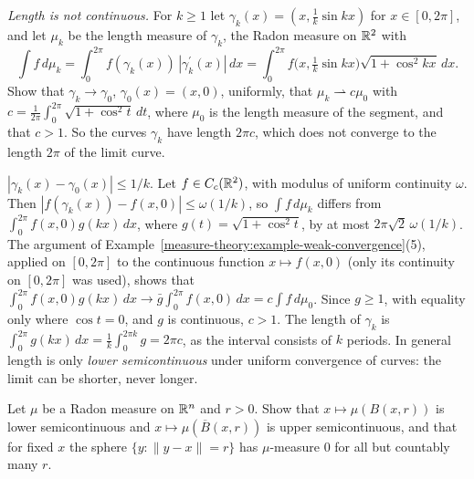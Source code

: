 \begin{exercise}\label{measure-theory:exercise-staircase}
\emph{Length is not continuous.} For $k \geq 1$ let $\gamma_k(x) = (x, \frac1k\sin kx)$ for $x \in [0, 2\pi]$, and let $\mu_k$ be the length measure of $\gamma_k$, the Radon measure on $\mathbb{R}^2$ with
\[
\int f\,d\mu_k = \int_0^{2\pi}f(\gamma_k(x))\,|\gamma_k^{\prime}(x)|\,dx = \int_0^{2\pi}f\bigl(x, \tfrac1k\sin kx\bigr)\sqrt{1 + \cos^2kx}\,dx .
\]
Show that $\gamma_k \to \gamma_0$, $\gamma_0(x) = (x, 0)$, uniformly, that $\mu_k \rightharpoonup c\mu_0$ with $c = \frac1{2\pi}\int_0^{2\pi}\sqrt{1 + \cos^2t}\,dt$, where $\mu_0$ is the length measure of the
segment, and that $c > 1$. So the curves $\gamma_k$ have length $2\pi c$, which does not converge to the length $2\pi$ of the limit curve.
\end{exercise}

\begin{solution}
$|\gamma_k(x) - \gamma_0(x)| \leq 1/k$. Let $f \in C_c(\mathbb{R}^2)$, with modulus of uniform continuity $\omega$. Then $|f(\gamma_k(x)) - f(x, 0)| \leq \omega(1/k)$, so $\int f\,d\mu_k$ differs from
$\int_0^{2\pi}f(x, 0)g(kx)\,dx$, where $g(t) = \sqrt{1 + \cos^2t}$, by at most $2\pi\sqrt2\,\omega(1/k)$. The argument of Example~\ref{measure-theory:example-weak-convergence}(5), applied on $[0, 2\pi]$ to the
continuous function $x \mapsto f(x, 0)$ (only its continuity on $[0, 2\pi]$ was used), shows that $\int_0^{2\pi}f(x, 0)g(kx)\,dx \to \bar g\int_0^{2\pi}f(x, 0)\,dx = c\int f\,d\mu_0$. Since $g \geq 1$, with
equality only where $\cos t = 0$, and $g$ is continuous, $c > 1$. The length of $\gamma_k$ is $\int_0^{2\pi}g(kx)\,dx = \frac1k\int_0^{2\pi k}g = 2\pi c$, as the interval consists of $k$ periods. In
general length is only \emph{lower semicontinuous} under uniform convergence of curves: the limit can be shorter, never longer.
\end{solution}

\begin{exercise}\label{measure-theory:exercise-ball-semicontinuous}
Let $\mu$ be a Radon measure on $\mathbb{R}^n$ and $r > 0$. Show that $x \mapsto \mu(B(x, r))$ is lower semicontinuous and $x \mapsto \mu(\overline{B}(x, r))$ is upper semicontinuous, and that for fixed $x$ the
sphere $\{y : \|y - x\| = r\}$ has $\mu$-measure $0$ for all but countably many $r$.
\end{exercise}

